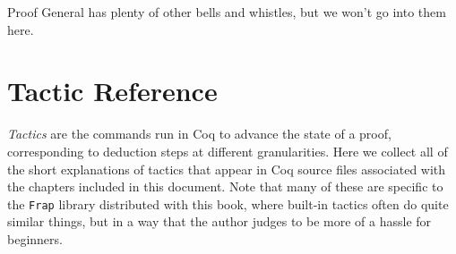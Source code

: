\documentclass{amsbook}
\theoremstyle{definition}
\theoremstyle{remark}
\numberwithin{section}{chapter}
\numberwithin{equation}{chapter}
\begin{document}
Proof General has plenty of other bells and whistles, but we won't go into them here.

\section{Tactic Reference}

\emph{Tactics} are the commands run in Coq to advance the state of a proof, corresponding to deduction steps at different granularities.
Here we collect all of the short explanations of tactics that appear in Coq source files associated with the chapters included in this document.
Note that many of these are specific to the \texttt{Frap} library distributed with this book, where built-in tactics often do quite similar things, but in a way that the author judges to be more of a hassle for beginners.
\end{document}
